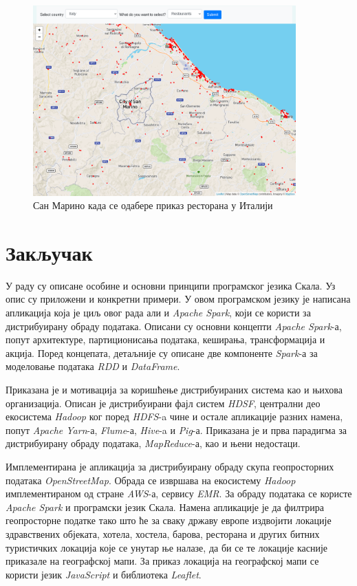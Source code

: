 \documentclass[12pt,oneside]{memoir}
\begin{document}
\begin{figure}[!ht]
  \centering
  \includegraphics[width=0.9\textwidth]{pictures/san_marino_italy_errors.png}
  \caption{Сан Марино када се одабере приказ ресторана у Италији}
  \label{fig:app_code_san_marino_italy}
\end{figure}

\chapter{Закључак}
\label{chp:zakljucak}

У раду су описане особине и основни принципи програмског језика Скала. Уз опис су приложени и конкретни примери. У овом програмском језику је написана апликација која је циљ овог рада али и \textit{Apache Spark}, који се користи за дистрибуирану обраду података. Описани су основни концепти \textit{Apache Spark}-а, попут архитектуре, партиционисања података, кеширања, трансформација и акција. Поред концепата, детаљније су описане две компоненте \textit{Spark}-а за моделовање података \textit{RDD} и \textit{DataFrame}.

Приказана је и мотивација за коришћење дистрибуираних система као и њихова организација. Описан је дистрибуирани фајл систем \textit{HDSF}, централни део екосистема \textit{Hadoop} ког поред \textit{HDFS}-a чине и остале апликације разних намена, попут \textit{Apache Yarn}-а, \textit{Flume}-а, \textit{Hive}-a и \textit{Pig}-а. Приказана је и прва парадигма за дистрибуирану обраду података, \textit{MapReduce}-а, као и њени недостаци.

Имплементирана је апликација за дистрибуирану обраду скупа геопросторних података \textit{OpenStreetMap}. Обрада се извршава на екосистему \textit{Hadoop} имплементираном од стране \textit{AWS}-а, сервису \textit{EMR}. За обраду података се користе \textit{Apache Spark} и програмски језик Скала. Намена апликације је да филтрира геопросторне податке тако што ће за сваку државу европе издвојити локације здравствених објеката, хотела, хостела, барова, ресторана и других битних туристичких локација које се унутар ње налазе, да би се те локације касније приказале на географској мапи. За приказ локација на географској мапи се користи језик \textit{JavaScript} и библиотека \textit{Leaflet}.
\end{document}
